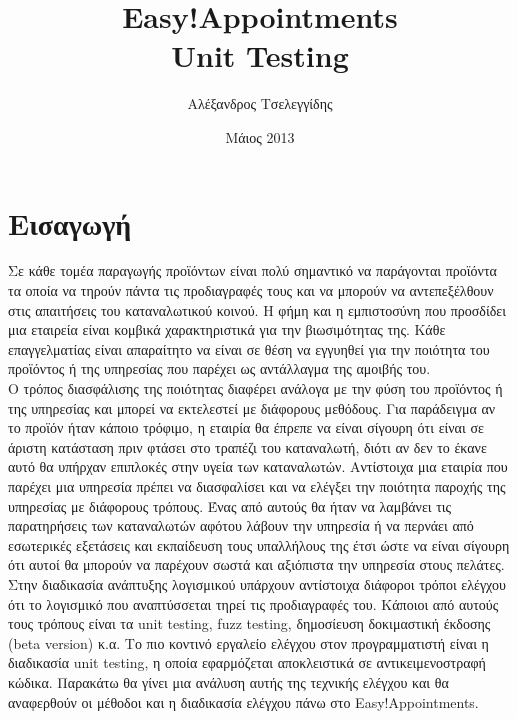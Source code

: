 \documentclass[12pt]{article}
\title{{\Huge {\bf Easy!Appointments}} \\[0.3cm] Unit Testing}
\author{Αλέξανδρος Τσελεγγίδης}
\date{Μάιος 2013}
\begin{document}
\maketitle 
\thispagestyle{empty} %

\section {Εισαγωγή}
Σε κάθε τομέα παραγωγής προϊόντων είναι πολύ σημαντικό να παράγονται προϊόντα τα οποία να τηρούν πάντα τις προδιαγραφές τους και να μπορούν να αντεπεξέλθουν στις απαιτήσεις του καταναλωτικού κοινού. Η φήμη και η εμπιστοσύνη που προσδίδει μια εταιρεία είναι κομβικά χαρακτηριστικά για την βιωσιμότητας της. Κάθε επαγγελματίας είναι απαραίτητο να είναι σε θέση να εγγυηθεί για την ποιότητα του προϊόντος ή της υπηρεσίας που παρέχει ως αντάλλαγμα της αμοιβής του.
\\[0.3cm]
Ο τρόπος διασφάλισης της ποιότητας διαφέρει ανάλογα με την φύση του προϊόντος ή της υπηρεσίας και μπορεί να εκτελεστεί με διάφορους μεθόδους. Για παράδειγμα αν το προϊόν ήταν κάποιο τρόφιμο, η εταιρία θα έπρεπε να είναι σίγουρη ότι είναι σε άριστη κατάσταση πριν φτάσει στο τραπέζι του καταναλωτή, διότι αν δεν το έκανε αυτό θα υπήρχαν επιπλοκές στην υγεία των καταναλωτών. Αντίστοιχα μια εταιρία που παρέχει μια υπηρεσία πρέπει να διασφαλίσει και να ελέγξει την ποιότητα παροχής της υπηρεσίας με διάφορους τρόπους. Ένας από αυτούς θα ήταν να λαμβάνει τις παρατηρήσεις των καταναλωτών αφότου λάβουν την υπηρεσία ή να περνάει από εσωτερικές εξετάσεις και εκπαίδευση τους υπαλλήλους της έτσι ώστε να είναι σίγουρη ότι αυτοί θα μπορούν να παρέχουν σωστά και αξιόπιστα την υπηρεσία στους πελάτες.
\\[0.3cm]
Στην διαδικασία ανάπτυξης λογισμικού υπάρχουν αντίστοιχα διάφοροι τρόποι ελέγχου ότι το λογισμικό που αναπτύσσεται τηρεί τις προδιαγραφές του. Κάποιοι από αυτούς τους τρόπους είναι τα unit testing, fuzz testing, δημοσίευση δοκιμαστική έκδοσης (beta version) κ.α. Το πιο κοντινό εργαλείο ελέγχου στον προγραμματιστή είναι η διαδικασία unit testing, η οποία εφαρμόζεται αποκλειστικά σε αντικειμενοστραφή κώδικα. Παρακάτω θα γίνει μια ανάλυση αυτής της τεχνικής ελέγχου και θα αναφερθούν οι μέθοδοι και η διαδικασία ελέγχου πάνω στο Easy!Appointments.
\end{document}
